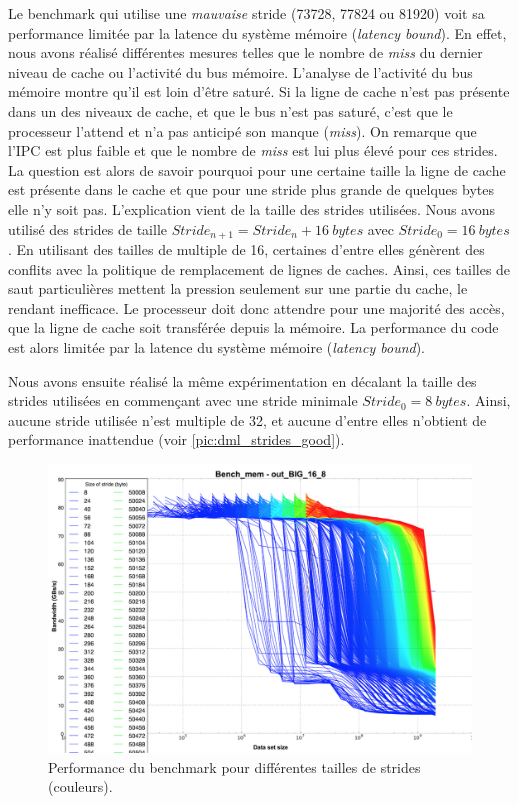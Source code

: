         
        Le benchmark qui utilise une \textit{mauvaise} stride (73728, 77824 ou 81920) voit sa performance limitée par la latence du système mémoire  (\textit{latency bound}). En effet, nous avons réalisé différentes mesures telles que le nombre de \textit{miss} du dernier niveau de cache ou l'activité du bus mémoire. L'analyse de l'activité du bus mémoire montre qu'il est loin d'être saturé. Si la ligne de cache n'est pas présente dans un des niveaux de cache, et que le bus n'est pas saturé, c'est que le processeur l'attend et n'a pas anticipé son manque (\textit{miss}). On remarque que l'IPC est plus faible et que le nombre de \textit{miss} est lui plus élevé pour ces strides. La question est alors de savoir pourquoi pour une certaine taille la ligne de cache est présente dans le cache et que pour une stride plus grande de quelques bytes elle n'y soit pas. L'explication vient de la taille des strides utilisées. Nous avons utilisé des strides de taille $ Stride_{n+1} = Stride_n + 16 ~ bytes$ avec $Stride_0 = 16 ~ bytes$. En utilisant des tailles de multiple de 16, certaines d'entre elles génèrent des conflits avec la politique de remplacement de lignes de caches. Ainsi, ces tailles de saut particulières mettent la pression seulement sur une partie du cache, le rendant inefficace. Le processeur doit donc attendre pour une majorité des accès, que la ligne de cache soit transférée depuis la mémoire. La performance du code est alors limitée par la latence du système mémoire (\textit{latency bound}).
        
        Nous avons ensuite réalisé la même expérimentation en décalant la taille des strides utilisées en commençant avec une stride minimale $Stride_0 =  8 ~ bytes$. Ainsi, aucune stride utilisée n'est multiple de 32, et aucune d'entre elles n’obtient de performance inattendue (voir \autoref{pic:dml_strides_good}).
        
        
        \begin{figure}
        \center
        \includegraphics[width=12cm]{images/dml_strides.png}
        \caption{\label{pic:dml_strides_good} Performance du benchmark pour différentes tailles de strides (couleurs).  }
        \end{figure}
        
